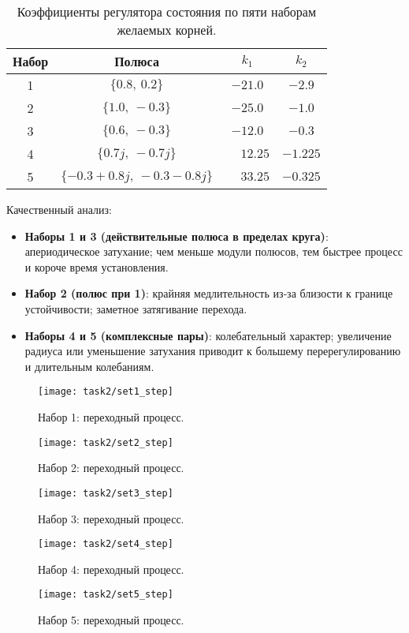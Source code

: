 \begin{table}[H]
  \centering
  \begin{tabular}{cccc}
    \toprule
    Набор & Полюса & $k_1$ & $k_2$ \\
    \midrule
    1 & $\{0.8,\ 0.2\}$ & $-21.0$ & $-2.9$ \\
    2 & $\{1.0,\ -0.3\}$ & $-25.0$ & $-1.0$ \\
    3 & $\{0.6,\ -0.3\}$ & $-12.0$ & $-0.3$ \\
    4 & $\{0.7j,\ -0.7j\}$ & $\phantom{-}12.25$ & $-1.225$ \\
    5 & $\{-0.3\!+\!0.8j,\ -0.3\!-\!0.8j\}$ & $\phantom{-}33.25$ & $-0.325$ \\
    \bottomrule
  \end{tabular}
  \caption{Коэффициенты регулятора состояния по пяти наборам желаемых корней.}
\end{table}

Качественный анализ:
\begin{itemize}
  \item \textbf{Наборы 1 и 3 (действительные полюса в пределах круга)}: апериодическое затухание; чем меньше модули полюсов, тем быстрее процесс и короче время установления.
  \item \textbf{Набор 2 (полюс при 1)}: крайняя медлительность из‑за близости к границе устойчивости; заметное затягивание перехода.
  \item \textbf{Наборы 4 и 5 (комплексные пары)}: колебательный характер; увеличение радиуса или уменьшение затухания приводит к большему перерегулированию и длительным колебаниям.
\end{itemize}

\begin{figure}[H]
  \centering
  \texttt{[image: task2/set1\_step]}
  \caption{Набор 1: переходный процесс.}
  \label{fig:task2_set1}
\end{figure}
\begin{figure}[H]
  \centering
  \texttt{[image: task2/set2\_step]}
  \caption{Набор 2: переходный процесс.}
  \label{fig:task2_set2}
\end{figure}
\begin{figure}[H]
  \centering
  \texttt{[image: task2/set3\_step]}
  \caption{Набор 3: переходный процесс.}
  \label{fig:task2_set3}
\end{figure}
\begin{figure}[H]
  \centering
  \texttt{[image: task2/set4\_step]}
  \caption{Набор 4: переходный процесс.}
  \label{fig:task2_set4}
\end{figure}
\begin{figure}[H]
  \centering
  \texttt{[image: task2/set5\_step]}
  \caption{Набор 5: переходный процесс.}
  \label{fig:task2_set5}
\end{figure}

